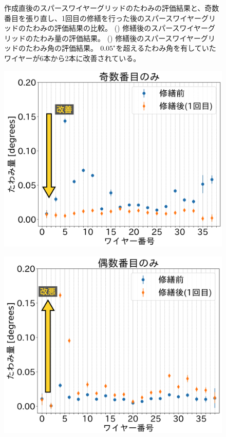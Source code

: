\documentclass[../../main.tex]{subfiles}
\begin{document}
\begin{figure}[H]
\begin{minipage}[b]{0.5\hsize}
        \subcaption{}
        \label{fig:wiresag_swg_sag_angle_result_repair}
    \end{minipage}
    \caption{作成直後のスパースワイヤーグリッドのたわみの評価結果と、奇数番目を張り直し、1回目の修繕を行った後のスパースワイヤーグリッドのたわみの評価結果の比較。
             () 修繕後のスパースワイヤーグリッドのたわみ量の評価結果。
             () 修繕後のスパースワイヤーグリッドのたわみ角の評価結果。
             $0.05\tcdegree$を超えるたわみ角を有していたワイヤーが6本から2本に改善されている。}
    \label{fig:wiresag_swg_result_repair}
\end{figure}
\begin{figure}[H]
    \begin{minipage}[b]{0.5\hsize}
        \centering
        \includegraphics[width=1.0\textwidth]{wiresag_swg/swg_sag_angle_odd_comparison.png}
        \subcaption{}
        \label{fig:wiresag_swg_sag_odd_comparison}
    \end{minipage}
    \begin{minipage}[b]{0.5\hsize}
        \centering
        \includegraphics[width=1.0\textwidth]{wiresag_swg/swg_sag_angle_even_comparison.png}

\end{minipage}
\end{figure}
\end{document}
